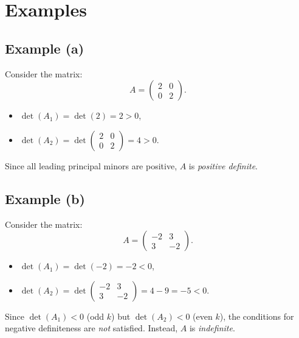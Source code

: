\documentclass{article}
\begin{document}
\section*{Examples}

\subsection*{Example (a)}
Consider the matrix:
\[
A = \begin{pmatrix}
2 & 0 \\
0 & 2
\end{pmatrix}.
\]
\begin{itemize}
    \item \( \det(A_1) = \det(2) = 2 > 0 \),
    \item \( \det(A_2) = \det \begin{pmatrix} 2 & 0 \\ 0 & 2 \end{pmatrix} = 4 > 0 \).
\end{itemize}
Since all leading principal minors are positive, \( A \) is \textit{positive definite}.

\subsection*{Example (b)}
Consider the matrix:
\[
A = \begin{pmatrix}
-2 & 3 \\
3 & -2
\end{pmatrix}.
\]
\begin{itemize}
    \item \( \det(A_1) = \det(-2) = -2 < 0 \),
    \item \( \det(A_2) = \det \begin{pmatrix} -2 & 3 \\ 3 & -2 \end{pmatrix} = 4 - 9 = -5 < 0 \).
\end{itemize}
Since \( \det(A_1) < 0 \) (odd \( k \)) but \( \det(A_2) < 0 \) (even \( k \)), the conditions for negative definiteness are \textit{not} satisfied. Instead, \( A \) is \textit{indefinite}.
\end{document}
